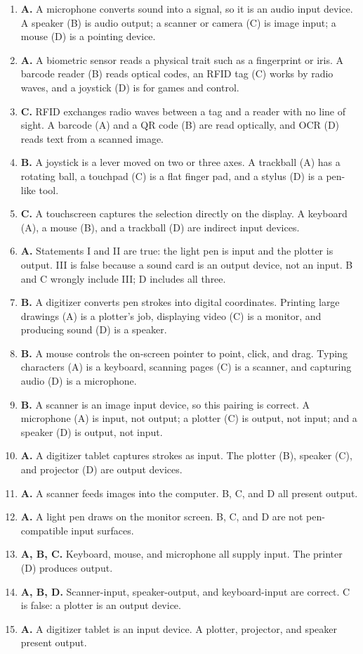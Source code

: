 \begin{enumerate}[label=\textbf{Q\arabic*.}, leftmargin=*]
\item \textbf{A.} A microphone converts sound into a signal, so it is an
  audio input device. A speaker (B) is audio output; a scanner or camera (C)
  is image input; a mouse (D) is a pointing device.
\item \textbf{A.} A biometric sensor reads a physical trait such as a
  fingerprint or iris. A barcode reader (B) reads optical codes, an RFID tag
  (C) works by radio waves, and a joystick (D) is for games and control.
\item \textbf{C.} RFID exchanges radio waves between a tag and a reader with
  no line of sight. A barcode (A) and a QR code (B) are read optically, and
  OCR (D) reads text from a scanned image.
\item \textbf{B.} A joystick is a lever moved on two or three axes. A
  trackball (A) has a rotating ball, a touchpad (C) is a flat finger pad, and
  a stylus (D) is a pen-like tool.
\item \textbf{C.} A touchscreen captures the selection directly on the
  display. A keyboard (A), a mouse (B), and a trackball (D) are indirect
  input devices.
\item \textbf{A.} Statements I and II are true: the light pen is input and
  the plotter is output. III is false because a sound card is an output
  device, not an input. B and C wrongly include III; D includes all three.
\item \textbf{B.} A digitizer converts pen strokes into digital coordinates.
  Printing large drawings (A) is a plotter's job, displaying video (C) is a
  monitor, and producing sound (D) is a speaker.
\item \textbf{B.} A mouse controls the on-screen pointer to point, click, and
  drag. Typing characters (A) is a keyboard, scanning pages (C) is a scanner,
  and capturing audio (D) is a microphone.
\item \textbf{B.} A scanner is an image input device, so this pairing is
  correct. A microphone (A) is input, not output; a plotter (C) is output,
  not input; and a speaker (D) is output, not input.

\item \textbf{A.} A digitizer tablet captures strokes as input. The plotter (B), speaker (C), and projector (D) are output devices.
\item \textbf{A.} A scanner feeds images into the computer. B, C, and D all present output.
\item \textbf{A.} A light pen draws on the monitor screen. B, C, and D are not pen-compatible input surfaces.
\item \textbf{A, B, C.} Keyboard, mouse, and microphone all supply input. The printer (D) produces output.
\item \textbf{A, B, D.} Scanner-input, speaker-output, and keyboard-input are correct. C is false: a plotter is an output device.
\item \textbf{A.} A digitizer tablet is an input device. A plotter, projector, and speaker present output.


\end{enumerate}
